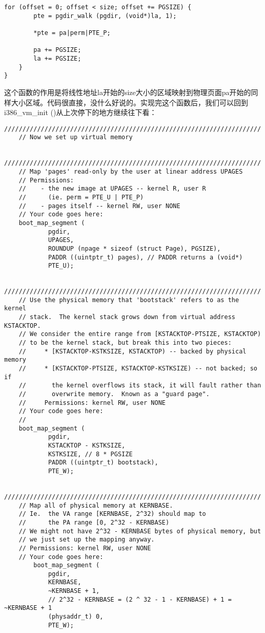 \documentclass{article}
\newcommand{\funcname}[1]{{\ttfamily \small #1}}
\begin{document}
\begin{CJK*}{UTF8}{gkai}
\begin{lstlisting}[style=ccode, title={\scriptsize \ttfamily \bfseries kern/pmap.c: boot\_map\_segment ()}]
    for (offset = 0; offset < size; offset += PGSIZE) {
        pte = pgdir_walk (pgdir, (void*)la, 1);

        *pte = pa|perm|PTE_P;

        pa += PGSIZE;
        la += PGSIZE;
    }
}
\end{lstlisting}

这个函数的作用是将线性地址la开始的size大小的区域映射到物理页面pa开始的同样大小区域。代码很直接，没什么好说的。实现完这个函数后，我们可以回到\funcname{i386\_vm\_init ()}从上次停下的地方继续往下看：



\begin{lstlisting}[style=ccode, title={\scriptsize \ttfamily \bfseries kern/pmap.c: i386\_vm\_init ()}]
	//////////////////////////////////////////////////////////////////////
	// Now we set up virtual memory 
	
	//////////////////////////////////////////////////////////////////////
	// Map 'pages' read-only by the user at linear address UPAGES
	// Permissions:
	//    - the new image at UPAGES -- kernel R, user R
	//      (ie. perm = PTE_U | PTE_P)
	//    - pages itself -- kernel RW, user NONE
	// Your code goes here:
	boot_map_segment (
            pgdir, 
            UPAGES, 
            ROUNDUP (npage * sizeof (struct Page), PGSIZE), 
            PADDR ((uintptr_t) pages), // PADDR returns a (void*)
            PTE_U);

	//////////////////////////////////////////////////////////////////////
	// Use the physical memory that 'bootstack' refers to as the kernel
	// stack.  The kernel stack grows down from virtual address KSTACKTOP.
	// We consider the entire range from [KSTACKTOP-PTSIZE, KSTACKTOP) 
	// to be the kernel stack, but break this into two pieces:
	//     * [KSTACKTOP-KSTKSIZE, KSTACKTOP) -- backed by physical memory
	//     * [KSTACKTOP-PTSIZE, KSTACKTOP-KSTKSIZE) -- not backed; so if
	//       the kernel overflows its stack, it will fault rather than
	//       overwrite memory.  Known as a "guard page".
	//     Permissions: kernel RW, user NONE
	// Your code goes here:
	//
	boot_map_segment (
            pgdir,
            KSTACKTOP - KSTKSIZE,
            KSTKSIZE, // 8 * PGSIZE
            PADDR ((uintptr_t) bootstack),
            PTE_W);

	//////////////////////////////////////////////////////////////////////
	// Map all of physical memory at KERNBASE. 
	// Ie.  the VA range [KERNBASE, 2^32) should map to
	//      the PA range [0, 2^32 - KERNBASE)
	// We might not have 2^32 - KERNBASE bytes of physical memory, but
	// we just set up the mapping anyway.
	// Permissions: kernel RW, user NONE
	// Your code goes here: 
        boot_map_segment (
            pgdir,
            KERNBASE,
            ~KERNBASE + 1, 
            // 2^32 - KERNBASE = (2 ^ 32 - 1 - KERNBASE) + 1 = ~KERNBASE + 1
            (physaddr_t) 0,
            PTE_W); 
\end{lstlisting}


\end{CJK*}
\end{document}
